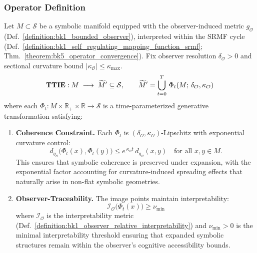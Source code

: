\subsubsection{Operator Definition}
\begin{definition}
\label{definition:bk4_test_time_integrative_expansion}
Let $M\subset \mathcal{S}$ be a symbolic manifold equipped with the observer-induced metric $g_{\mathcal{O}}$ (Def.~\ref{definition:bk1_bounded_observer}), interpreted within the SRMF cycle (Def.~\ref{definition:bk1_self_regulating_mapping_function_srmf}; Thm.~\ref{theorem:bk5_operator_convergence}). Fix observer resolution $\delta_{\mathcal{O}}\!>\!0$ and sectional curvature bound $|\kappa_{\mathcal{O}}|\le \kappa_{\max}$.
\[
\text{\bf TTIE}: M\;\longrightarrow\;\widetilde{M}'\subseteq\mathcal{S},
\qquad
\widetilde{M}'=\bigcup_{t=0}^{T}\,
  \Phi_t\!\left(M;\,\delta_{\mathcal{O}},\kappa_{\mathcal{O}}\right)
\]
where each $\Phi_t: M \times \mathbb{R}_+ \times \mathbb{R} \to \mathcal{S}$ is a time-parameterized generative transformation satisfying:
\begin{enumerate}[label=\textbf{C\arabic*}]
\item \textbf{Coherence Constraint.} Each $\Phi_t$ is $(\delta_{\mathcal{O}},\kappa_{\mathcal{O}})$-Lipschitz with exponential curvature control:
\[
d_{g_{\mathcal{O}}}\!\bigl(\Phi_t(x),\Phi_t(y)\bigr)\le
e^{\,\kappa_{\mathcal{O}}t}\,d_{g_{\mathcal{O}}}(x,y)
\quad\text{for all } x,y\in M.
\]
This ensures that symbolic coherence is preserved under expansion, with the exponential factor accounting for curvature-induced spreading effects that naturally arise in non-flat symbolic geometries.

\item \textbf{Observer-Traceability.} The image points maintain interpretability:
\[
\mathcal{I}_{\mathcal{O}}\bigl(\Phi_t(x)\bigr)\ge\nu_{\min}
\]
where $\mathcal{I}_{\mathcal{O}}$ is the interpretability metric (Def.~\ref{definition:bk1_observer_relative_interpretability}) and $\nu_{\min} > 0$ is the minimal interpretability threshold ensuring that expanded symbolic structures remain within the observer's cognitive accessibility bounds.


\end{enumerate}
\end{definition}
